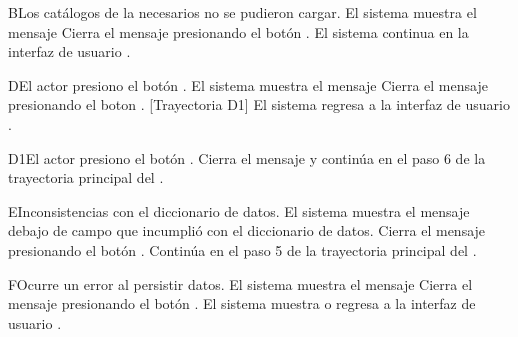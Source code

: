 \begin{UCtrayectoriaA}{B}{Los catálogos de la  necesarios no se pudieron cargar.}
	\UCpaso El sistema muestra el mensaje 
	\UCpaso[\UCactor] Cierra el mensaje presionando el botón .
	\UCpaso El sistema continua en la interfaz de usuario .
\end{UCtrayectoriaA}



\begin{UCtrayectoriaA}{D}{El actor presiono el botón .}
	\UCpaso El sistema muestra el mensaje 
	\UCpaso[\UCactor] Cierra el mensaje presionando el boton . [Trayectoria D1]
	\UCpaso El sistema regresa a la interfaz de usuario .
\end{UCtrayectoriaA}

	\begin{UCtrayectoriaA}{D1}{El actor presiono el botón .}
	\UCpaso Cierra el mensaje y continúa en el paso 6 de la trayectoria principal del .	
\end{UCtrayectoriaA}

\begin{UCtrayectoriaA}{E}{Inconsistencias con el diccionario de datos.}
	\UCpaso El sistema muestra el mensaje  debajo de campo que incumplió con el diccionario de datos.
	\UCpaso[\UCactor] Cierra el mensaje presionando el botón .
	\UCpaso Continúa en el paso 5 de la trayectoria principal del .
\end{UCtrayectoriaA}


\begin{UCtrayectoriaA}{F}{Ocurre un error al persistir datos.}
	\UCpaso El sistema muestra el mensaje 
	\UCpaso[\UCactor] Cierra el mensaje presionando el botón .
	\UCpaso El sistema muestra o regresa a la interfaz de usuario  .
\end{UCtrayectoriaA}




